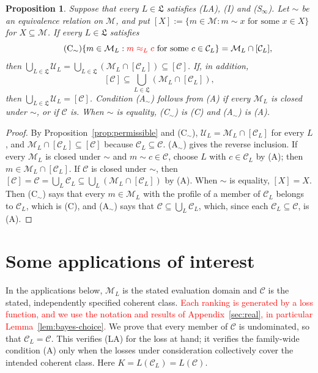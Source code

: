\documentclass[11pt]{article}
\newtheorem{proposition}[theorem]{Proposition}
\theoremstyle{definition}
\theoremstyle{remark}
\newcommand{\M}{\mathcal M}
\newcommand{\C}{\mathcal C}
\newcommand{\U}{\mathcal U}
\begin{document}
\begin{proposition}\label{prop:permissible-equivalence}
Suppose that every $L\in\mathfrak L$ satisfies (LA), (I) and (S$_\infty$). Let $\sim$ be an equivalence relation on $\M$, and put $[X]:=\{m\in\M:m\sim x\text{ for some }x\in X\}$ for $X\subseteq\M$. If every $L\in\mathfrak L$ satisfies
\begin{equation}\tag{C$_\sim$}\label{eq:identification-equivalence}
 \{m\in\M_L:\textcolor{red}{m\approx_L c}\text{ for some }c\in\C_L\}
 =\M_L\cap[\C_L],
\end{equation}
then $\bigcup_{L\in\mathfrak L}\U_L=\bigcup_{L\in\mathfrak L}(\M_L\cap[\C_L])\subseteq[\C]$. If, in addition,
\begin{equation}\tag{A$_\sim$}\label{eq:equivalence-coverage}
 [\C]\subseteq\bigcup_{L\in\mathfrak L}(\M_L\cap[\C_L]),
\end{equation}
then $\bigcup_{L\in\mathfrak L}\U_L=[\C]$. Condition (A$_\sim$) follows from (A) if every $\M_L$ is closed under $\sim$, or if $\C$ is. When $\sim$ is equality, (C$_\sim$) is (C) and (A$_\sim$) is (A).
\end{proposition}
\begin{proof}
By Proposition~\ref{prop:permissible} and (C$_\sim$), $\U_L=\M_L\cap[\C_L]$ for every $L$, and $\M_L\cap[\C_L]\subseteq[\C]$ because $\C_L\subseteq\C$. (A$_\sim$) gives the reverse inclusion. If every $\M_L$ is closed under $\sim$ and $m\sim c\in\C$, choose $L$ with $c\in\C_L$ by (A); then $m\in\M_L\cap[\C_L]$. If $\C$ is closed under $\sim$, then $[\C]=\C=\bigcup_L\C_L\subseteq\bigcup_L(\M_L\cap[\C_L])$ by (A). When $\sim$ is equality, $[X]=X$. Then (C$_\sim$) says that every $m\in\M_L$ with the profile of a member of $\C_L$ belongs to $\C_L$, which is (C), and (A$_\sim$) says that $\C\subseteq\bigcup_L\C_L$, which, since each $\C_L\subseteq\C$, is (A).
\end{proof}


\newpage

\section{Some applications of interest}\label{sec:apps}
In the applications below, $\M_L$ is the stated evaluation domain and $\C$ is the stated, independently specified coherent class. \textcolor{red}{Each ranking is generated by a loss function, and we use the notation and results of Appendix~\ref{sec:real}, in particular Lemma~\ref{lem:bayes-choice}.} We prove that every member of $\C$ is undominated, so that $\C_L=\C$. This verifies (LA) for the loss at hand; it verifies the family-wide condition (A) only when the losses under consideration collectively cover the intended coherent class. Here $K=L(\C_L)=L(\C)$.
\end{document}
